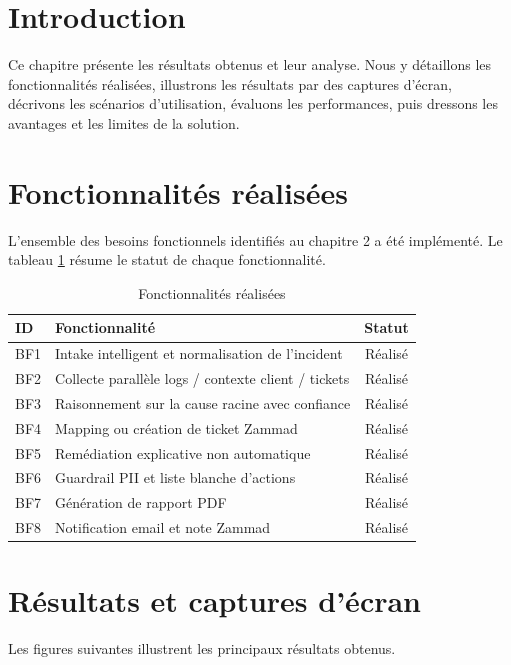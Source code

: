\section*{Introduction}
Ce chapitre présente les résultats obtenus et leur analyse. Nous y détaillons les fonctionnalités réalisées, illustrons les résultats par des captures d'écran, décrivons les scénarios d'utilisation, évaluons les performances, puis dressons les avantages et les limites de la solution.

\section{Fonctionnalités réalisées}
L'ensemble des besoins fonctionnels identifiés au chapitre 2 a été implémenté. Le tableau \ref{tab:fonctionnalites} résume le statut de chaque fonctionnalité.

\begin{table}[H]
    \centering
    \renewcommand{\arraystretch}{1.2}
    \begin{tabular}{|l|p{8cm}|c|}
        \hline
        \rowcolor{iNavy} \textbf{\color{white}ID} & \textbf{\color{white}Fonctionnalité} & \textbf{\color{white}Statut} \\ \hline
        BF1 & Intake intelligent et normalisation de l'incident & Réalisé \\ \hline
        BF2 & Collecte parallèle logs / contexte client / tickets & Réalisé \\ \hline
        BF3 & Raisonnement sur la cause racine avec confiance & Réalisé \\ \hline
        BF4 & Mapping ou création de ticket Zammad & Réalisé \\ \hline
        BF5 & Remédiation explicative non automatique & Réalisé \\ \hline
        BF6 & Guardrail PII et liste blanche d'actions & Réalisé \\ \hline
        BF7 & Génération de rapport PDF & Réalisé \\ \hline
        BF8 & Notification email et note Zammad & Réalisé \\ \hline
    \end{tabular}
    \caption{Fonctionnalités réalisées}
    \label{tab:fonctionnalites}
\end{table}

\section{Résultats et captures d'écran}
Les figures suivantes illustrent les principaux résultats obtenus.


